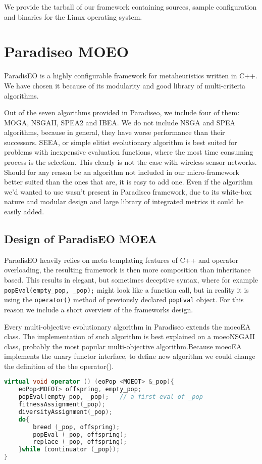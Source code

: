 \documentclass[12pt,oneside]{fithesis2}
\begin{document}
We provide the tarball of our framework containing sources, sample configuration and binaries for the Linux operating system\cite{tarball}.

\section{Paradiseo MOEO}
ParadisEO is a highly configurable framework for metaheuristics written in C++. We have chosen it because of its modularity and good library of multi-criteria algorithms.\cite{liefooghe2007Paradiseo} 

Out of the seven algorithms provided in Paradiseo, we include four of them: MOGA, NSGAII, SPEA2 and IBEA. We do not include NSGA and SPEA algorithms, because in general, they have worse performance than their successors.\cite{deb2002fast}\cite{zitzler2001spea2} SEEA, or simple elitist evolutionary algorithm is best suited for problems with inexpensive evaluation functions, where the most time consuming process is the selection. This clearly is not the case with wireless sensor networks. Should for any reason be an algorithm not included in our micro-framework better suited than the ones that are, it is easy to add one. Even if the algorithm we'd wanted to use wasn't present in Paradiseo framework, due to its white-box nature and modular design and large library of integrated metrics it could be easily added. 

\subsection{Design of ParadisEO MOEA}
ParadisEO heavily relies on meta-templating features of C++ and operator overloading, the resulting framework is then more composition than inheritance based. This results in elegant, but sometimes deceptive syntax, where for example \lstinline{popEval(empty_pop, _pop);} might look like a function call, but in reality it is using the \lstinline{operator()} method of previously declared \lstinline{popEval} object. For this reason we include a short overview of the frameworks design.

Every multi-objective evolutionary algorithm in Paradiseo extends the moeoEA class. The implementation of such algorithm is best explained on a  moeoNSGAII class, probably the most popular multi-objective algorithm.Because moeoEA implements the unary functor interface, to define new algorithm we could change the definition of the the operator().

\begin{lstlisting}[language=C++,label=evolution,caption=NSGAII algorithm in Paradiseo]
virtual void operator () (eoPop <MOEOT> &_pop){
    eoPop<MOEOT> offspring, empty_pop;
    popEval(empty_pop, _pop);	// a first eval of _pop
    fitnessAssignment(_pop);
    diversityAssignment(_pop);
    do{
        breed (_pop, offspring);
        popEval (_pop, offspring);
        replace (_pop, offspring);
    }while (continuator (_pop));
}
\end{lstlisting}
\end{document}

